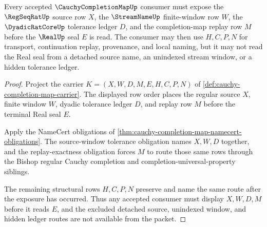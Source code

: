 \begin{theorem}
\label{thm:cauchy-completion-map-source-window-tolerance-exposure}
Every accepted $\CauchyCompletionMapUp$ consumer must expose the $\RegSeqRatUp$ source row $X$, the $\StreamNameUp$ finite-window row $W$, the $\DyadicRatCoreUp$ tolerance ledger $D$, and the completion-map replay row $M$ before the $\RealUp$ seal $E$ is read. The consumer may then use $H,C,P,N$ for transport, continuation replay, provenance, and local naming, but it may not read the Real seal from a detached source name, an unindexed stream window, or a hidden tolerance ledger.
\end{theorem}
\begin{proof}
Project the carrier $K=(X,W,D,M,E,H,C,P,N)$ of \autoref{def:cauchy-completion-map-carrier}. The displayed row order places the regular source $X$, finite window $W$, dyadic tolerance ledger $D$, and replay row $M$ before the terminal Real seal $E$.

Apply the NameCert obligations of \autoref{thm:cauchy-completion-map-namecert-obligations}. The source-window tolerance obligation names $X,W,D$ together, and the replay-exactness obligation forces $M$ to route those same rows through the Bishop regular Cauchy completion and completion-universal-property siblings.

The remaining structural rows $H,C,P,N$ preserve and name the same route after the exposure has occurred. Thus any accepted consumer must display $X,W,D,M$ before it reads $E$, and the excluded detached source, unindexed window, and hidden ledger routes are not available from the packet.
\end{proof}




